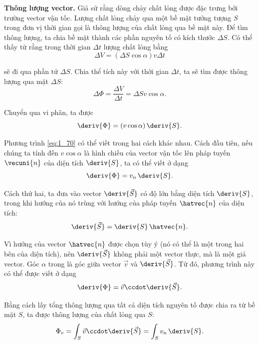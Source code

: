 \textbf{Thông lượng vector.} Giả sử rằng dòng chảy chất lỏng được đặc trưng bởi trường vector vận tốc. Lượng chất lỏng chảy qua một bề mặt tưởng tượng $S$ trong đơn vị thời gian gọi là thông lượng của chất lỏng qua bề mặt này. Để tìm thông lượng, ta chia bề mặt thành các phần nguyên tố có kích thước $\Delta{S}$. Có thể thấy từ  rằng trong thời gian $\Delta{t}$ lượng chất lỏng bằng
\begin{equation*}
	\Delta{V} = (\Delta{S}\cos\alpha) v\Delta{t}
\end{equation*}

\noindent
sẽ đi qua phần tử $\Delta{S}$. Chia thể tích này với thời gian $\Delta{t}$, ta sẽ tìm được thông lượng qua mặt $\Delta{S}$:
\begin{equation*}
	\Delta{\Phi} = \frac{\Delta{V}}{\Delta{t}} = \Delta{S} v \cos\alpha.
\end{equation*}

\noindent
Chuyển qua vi phân, ta được
\begin{equation}\label{eq:1_70}
	\deriv{\Phi} = (v \cos\alpha)\, \deriv{S}.
\end{equation}

\noindent
Phương trình \eqref{eq:1_70} có thể viết trong hai cách khác nhau. Cách đầu tiên, nếu chúng ta tính đến $v\cos\alpha$ là hình chiếu của vector vận tốc lên pháp tuyến $\vecuni{n}$ của diện tích $\deriv{S}$, ta có thể viết  ở dạng
\begin{equation}\label{eq:1_71}
	\deriv{\Phi} = v_n\, \deriv{S}.
\end{equation}

\noindent
Cách thứ hai, ta đưa vào vector $\deriv{\vec{S}}$ có độ lớn bằng diện tích $\deriv{S}$, trong khi hướng của nó trùng với hướng của pháp tuyến $\hatvec{n}$ của diện tích:
\begin{equation*}
	\deriv{\vec{S}} = \deriv{S}\, \hatvec{n}.
\end{equation*}

\noindent
Vì hướng của vector $\hatvec{n}$ được chọn tùy ý (nó có thể là một trong hai bên của diện tích), nên $\deriv{\vec{S}}$ không phải một vector thực, mà là một giả vector. Góc $\alpha$ trong  là góc giữa vector $\vec{v}$ và $\deriv{\vec{S}}$. Từ đó, phương trình này có thể được viết ở dạng
\begin{equation}\label{eq:1_72}
	\deriv{\Phi} = \vec{v} \ccdot \deriv{\vec{S}}.
\end{equation}

Bằng cách lấy tổng thông lượng qua tất cả diện tích nguyên tố được chia ra từ bề mặt $S$, ta được thông lượng của chất lỏng qua $S$:
\begin{equation}\label{eq:1_73}
	\Phi_v = \int_S \vec{v} \ccdot \deriv{\vec{S}} = \int_S v_n\, \deriv{S}.
\end{equation}

